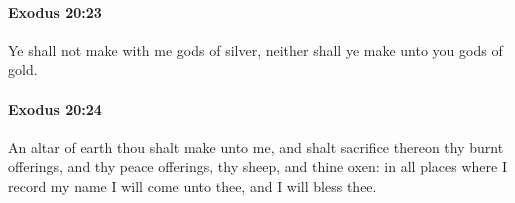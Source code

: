 		\paragraph{Exodus 20:23} %
			\label{EXODUS-20-23}

			Ye shall not make with me gods of silver, neither shall ye make unto you gods of gold.


		\paragraph{Exodus 20:24} %
			\label{EXODUS-20-24}

			An altar of earth thou shalt make unto me, and shalt sacrifice thereon thy burnt offerings, and thy peace offerings, thy sheep, and thine oxen: in all places where I record my name I will come unto thee, and I will bless thee.


